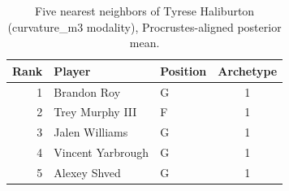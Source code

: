 \begin{table}[htbp]
  \centering\small
  \begin{tabular}{rllc}
    \toprule
    Rank & Player & Position & Archetype \\
    \midrule
    1 & Brandon Roy & G & 1 \\
    2 & Trey Murphy III & F & 1 \\
    3 & Jalen Williams & G & 1 \\
    4 & Vincent Yarbrough & G & 1 \\
    5 & Alexey Shved & G & 1 \\
    \bottomrule
  \end{tabular}
  \caption{Five nearest neighbors of Tyrese Haliburton (curvature_m3 modality), Procrustes-aligned posterior mean.}
  \label{tab:Tyrese_Haliburton_neighbors_curvature_m3}
\end{table}


